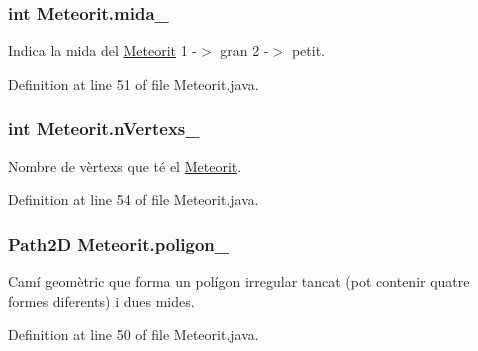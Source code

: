 \hypertarget{class_meteorit_a8edd607e17be6537c15ab04bfd29dc52}{}
\subsubsection[{mida\+\_\+}]{\setlength{\rightskip}{0pt plus 5cm}int Meteorit.\+mida\+\_\+\hspace{0.3cm}{\ttfamily [private]}}\label{class_meteorit_a8edd607e17be6537c15ab04bfd29dc52}


Indica la mida del \hyperlink{class_meteorit}{Meteorit} 1 -\/$>$ gran 2 -\/$>$ petit. 



Definition at line 51 of file Meteorit.\+java.

\hypertarget{class_meteorit_a3b015faa09e271a0e54de95d1c9716c6}{}
\subsubsection[{n\+Vertexs\+\_\+}]{\setlength{\rightskip}{0pt plus 5cm}int Meteorit.\+n\+Vertexs\+\_\+\hspace{0.3cm}{\ttfamily [private]}}\label{class_meteorit_a3b015faa09e271a0e54de95d1c9716c6}


Nombre de vèrtexs que té el \hyperlink{class_meteorit}{Meteorit}. 



Definition at line 54 of file Meteorit.\+java.

\hypertarget{class_meteorit_a1dd8a11e4ec8c806ee66a50773daeaf7}{}
\subsubsection[{poligon\+\_\+}]{\setlength{\rightskip}{0pt plus 5cm}Path2\+D Meteorit.\+poligon\+\_\+\hspace{0.3cm}{\ttfamily [private]}}\label{class_meteorit_a1dd8a11e4ec8c806ee66a50773daeaf7}


Camí geomètric que forma un polígon irregular tancat (pot contenir quatre formes diferents) i dues mides. 



Definition at line 50 of file Meteorit.\+java.

